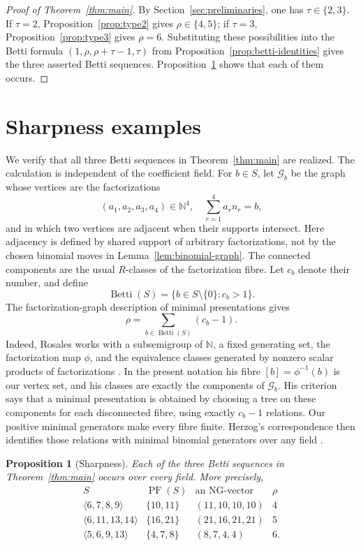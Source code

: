 \documentclass[10pt]{amsart}
\theoremstyle{plain}
\newtheorem{proposition}[lemma]{Proposition}
\begin{document}
\begin{proof}[Proof of Theorem~\ref{thm:main}]
By Section~\ref{sec:preliminaries}, one has \(\tau\in\{2,3\}\).
If \(\tau=2\), Proposition~\ref{prop:type2} gives
\(\rho\in\{4,5\}\); if \(\tau=3\), Proposition~\ref{prop:type3}
gives \(\rho=6\).  Substituting these possibilities into the Betti
formula \((1,\rho,\rho+\tau-1,\tau)\) from
Proposition~\ref{prop:betti-identities} gives the three asserted
Betti sequences.  Proposition~\ref{prop:sharpness} shows that each of
them occurs.
\end{proof}

\appendix
\section{Sharpness examples}\label{app:sharpness}

We verify that all three Betti sequences in Theorem~\ref{thm:main} are
realized.  The calculation is independent of the coefficient field.  For
\(b\in S\), let \(\mathcal G_b\) be the graph whose vertices are the
factorizations
\[
(a_1,a_2,a_3,a_4)\in\mathbb N^4,
\quad \sum_{r=1}^4a_rn_r=b,
\]
and in which two vertices are adjacent when their supports intersect.  Here adjacency is defined by shared support of arbitrary factorizations,
not by the chosen binomial moves in Lemma~\ref{lem:binomial-graph}.
The connected components are the usual \(R\)-classes of the
factorization fibre.  Let \(c_b\) denote their number, and define
\[
\operatorname{Betti}(S)=\{b\in S\setminus\{0\}:c_b>1\}.
\]
The factorization-graph description of minimal presentations gives
\[
\rho=\sum_{b\in\operatorname{Betti}(S)}(c_b-1).
\]
Indeed, Rosales works with a subsemigroup of \(\mathbb N\), a fixed
generating set, the factorization map \(\phi\), and the equivalence
classes generated by nonzero scalar products of factorizations
\cite[Theorem~1.2 and Corollary~1.3]{Rosales96}.
In the present notation his fibre \([b]=\phi^{-1}(b)\) is our vertex
set, and his classes are exactly the components of \(\mathcal G_b\).
His criterion says that a minimal presentation is obtained by choosing
a tree on these components for each disconnected fibre, using exactly
\(c_b-1\) relations.  Our positive minimal generators make every fibre
finite.  Herzog's correspondence then identifies those relations with
minimal binomial generators over any field
\cite[Proposition~1.5]{Herzog70}.

\begin{proposition}[Sharpness]\label{prop:sharpness}
Each of the three Betti sequences in Theorem~\ref{thm:main} occurs over every
field.  More precisely,
\[
\begin{array}{c|c|c|c}
S & \operatorname{PF}(S) & \text{an NG-vector} & \rho \\ \hline
\langle6,7,8,9\rangle & \{10,11\} & (11,10,10,10) & 4\\
\langle6,11,13,14\rangle & \{16,21\} & (21,16,21,21) & 5\\
\langle5,6,9,13\rangle & \{4,7,8\} & (8,7,4,4) & 6.
\end{array}
\]
\end{proposition}
\end{document}
